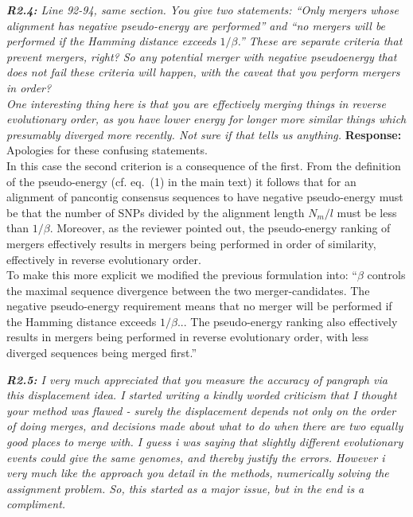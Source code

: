 \documentclass[aps,rmp,onecolumn]{revtex4-1}
\newcommand{\reviewer}[2]{{\it \textbf{#1:} #2\vskip 5mm}}
\newcommand{\response}[1]{{{\color{response}\textbf{Response:} #1}}\vskip 5mm}
\begin{document}
\reviewer{R2.4}{Line 92-94, same section. You give two statements:
      ``Only mergers whose alignment has negative pseudo-energy are performed''
      and
      ``no mergers will be performed if the Hamming distance exceeds $1/\beta$.''
      These are separate criteria that prevent mergers, right? So any potential merger with negative pseudoenergy that does not fail these criteria will happen, with the caveat that you perform mergers in order?\\
      One interesting thing here is that you are effectively merging things in reverse evolutionary order, as you have lower energy for longer more similar things which presumably diverged more recently. Not sure if that tells us anything.}
\response{
      Apologies for these confusing statements.\\
      In this case the second criterion is a consequence of the first. From the definition of the pseudo-energy (cf. eq.~(1) in the main text) it follows that for an alignment of pancontig consensus sequences to have negative pseudo-energy must be that the number of SNPs divided by the alignment length $N_m/l$ must be less than $1/\beta$. Moreover, as the reviewer pointed out, the pseudo-energy ranking of mergers effectively results in mergers being performed in order of similarity, effectively in reverse evolutionary order. \\

      To make this more explicit we modified the previous formulation into: ``$\beta$ controls the maximal sequence divergence between the two merger-candidates. The negative pseudo-energy requirement means that no merger will be performed if the Hamming distance exceeds $1/\beta$... The pseudo-energy ranking also effectively results in mergers being performed in reverse evolutionary order, with less diverged sequences being merged first.''
}

\reviewer{R2.5}{I very much appreciated that you measure the accuracy of pangraph via this displacement idea. I started writing a kindly worded criticism that I thought your method was flawed - surely the displacement depends not only on the order of doing merges, and decisions made about what to do when there are two equally good places to merge with. I guess i was saying that slightly different evolutionary events could give the same genomes, and thereby justify the errors. However i very much like the approach you detail in the methods, numerically solving the assignment problem. So, this started as a major issue, but in the end is a compliment.}
\end{document}
